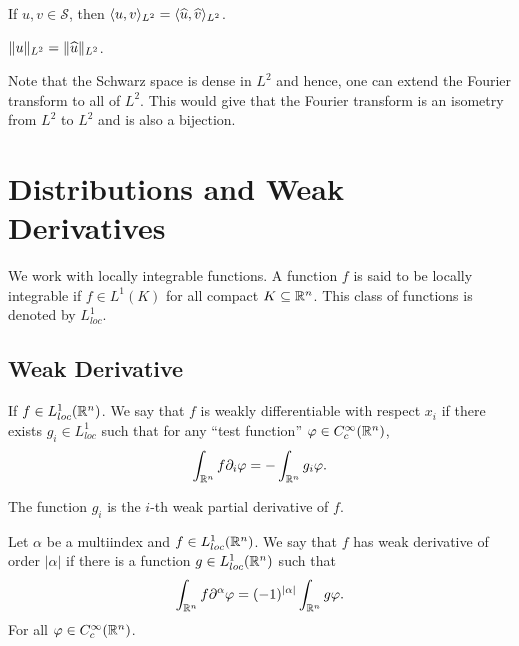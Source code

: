 \begin{theorem}
    If $u,v\in\mathscr S$, then $\langle u, v\rangle_{L^2} = \langle\widehat{u},\widehat{v}\rangle_{L^2}$.
\end{theorem}

\begin{theorem}
    $\|u\|_{L^2} = \|\widehat{u}\|_{L^2}$.
\end{theorem}

Note that the Schwarz space is dense in $L^2$ and hence, one can extend the Fourier transform to all of $L^2$. This would give that the Fourier transform is an isometry from $L^2$ to $L^2$ and is also a bijection.

\section*{Distributions and Weak Derivatives}

We work with locally integrable functions. A function $f$ is said to be locally integrable if $f\in L^1(K)$ for all compact $K\subseteq\mathbb{R}^n$. This class of functions is denoted by $L^1_{loc}$.

\subsection*{Weak Derivative}

\begin{definition}
    If $f\in L^1_{loc}(\mathbb{R}^n)$. We say that $f$ is weakly differentiable with respect $x_i$ if there exists $g_i\in L^1_{loc}$ such that for any ``test function'' $\varphi\in C_c^{\infty}(\mathbb{R}^n)$, 
    \begin{equation*}
        \int_{\mathbb{R}^n} f\partial_i\varphi = -\int_{\mathbb{R}^n} g_i\varphi.
    \end{equation*}

    The function $g_i$ is the $i$-th weak partial derivative of $f$.
\end{definition}

\begin{definition}
    Let $\alpha$ be a multiindex and $f\in L^1_{loc}(\mathbb{R}^n)$. We say that $f$ has weak derivative of order $|\alpha|$ if there is a function $g\in L^1_{loc}(\mathbb{R}^n)$ such that 
    \begin{equation*}
        \int_{\mathbb{R}^n} f\partial^{\alpha}\varphi = (-1)^{|\alpha|}\int_{\mathbb{R}^n} g\varphi.
    \end{equation*}
    For all $\varphi\in C_c^\infty(\mathbb{R}^n)$.
\end{definition}

